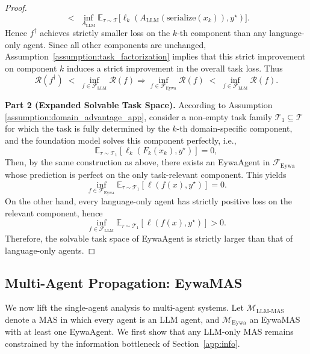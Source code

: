 \documentclass{llmxive}
\begin{document}
{\begin{proof}
\begin{equation}
\;<\;
\inf_{A_{\mathrm{LLM}}}\mathbb{E}_{\tau\sim\mathcal{T}}
\big[\ell_k(A_{\mathrm{LLM}}(\mathrm{serialize}(x_k)),y^\star)\big].
\end{equation}
Hence $f^\dagger$ achieves strictly smaller loss on the $k$-th component than any language-only agent. Since all other components are unchanged, Assumption~\ref{assumption:task_factorization} implies that this strict improvement on component $k$ induces a strict improvement in the overall task loss. Thus
\begin{equation}
\mathcal{R}(f^\dagger)
\;<\;
\inf_{f\in\mathcal{F}_{\mathrm{LLM}}}\mathcal{R}(f)
\Longrightarrow
\inf_{f\in\mathcal{F}_{\mathrm{Eywa}}}\mathcal{R}(f)
\;<\;
\inf_{f\in\mathcal{F}_{\mathrm{LLM}}}\mathcal{R}(f).
\end{equation}


\textbf{Part 2 (Expanded Solvable Task Space).}
According to Assumption \ref{assumption:domain_advantage_app}, consider a non-empty task family $\mathcal{T}_1\subseteq\mathcal{T}$ for which the task is fully determined by the $k$-th domain-specific component, and  the foundation model solves this component perfectly, i.e.,
\begin{equation}
\mathbb{E}_{\tau\sim\mathcal{T}_1}[\ell_k(F_k(x_k),y^\star)] = 0,
\end{equation}
Then, by the same construction as above, there exists an EywaAgent in $\mathcal{F}_{\mathrm{Eywa}}$ whose prediction is perfect on the only task-relevant component. This yields
\begin{equation}
\inf_{f\in\mathcal{F}_{\mathrm{Eywa}}}
\mathbb{E}_{\tau\sim\mathcal{T}_1}[\ell(f(x),y^\star)] = 0.
\end{equation}
On the other hand, every language-only agent has strictly positive loss on the relevant component, hence
\begin{equation}
\inf_{f\in\mathcal{F}_{\mathrm{LLM}}}
\mathbb{E}_{\tau\sim\mathcal{T}_1}[\ell(f(x),y^\star)] > 0.
\end{equation}
Therefore, the solvable task space of EywaAgent is strictly larger than that of language-only agents.
\end{proof}



\subsection{Multi-Agent Propagation: EywaMAS}
\label{app:mas}

We now lift the single-agent analysis to multi-agent systems. Let $\mathcal{M}_{\mathrm{LLM\text{-}MAS}}$ denote a MAS in which every agent is an LLM agent, and $\mathcal{M}_{\mathrm{Eywa}}$ an EywaMAS with at least one EywaAgent. We first show that any LLM-only MAS remains constrained by the information bottleneck of Section~\ref{app:info}.

}
\end{document}

